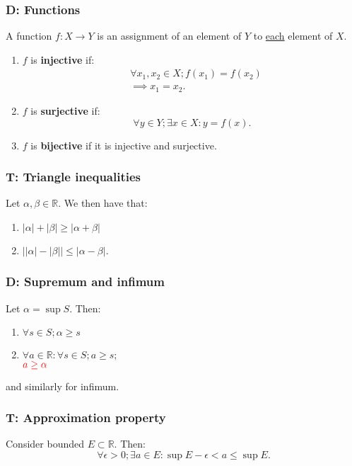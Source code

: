 \documentclass{article}
\begin{document}
\begin{multicols*}{3}
\noindent

\subsubsection*{D: Functions}
A function $f:X\rightarrow Y$ is an assignment
of an element of $Y$ to \underline{each} element of $X$.
\begin{enumerate}
    \item $f$ is \textbf{injective} if:
    \begin{align*}
        &\forall x_1,x_2\in X;
        f(x_1)=f(x_2) \\ &\implies x_1=x_2.
    \end{align*}

    \item $f$ is \textbf{surjective} if:
    $$\forall y\in Y;\exists x\in X: y=f(x).$$

    \item $f$ is \textbf{bijective}
    if it is injective and surjective.
\end{enumerate}

\subsubsection*{T: Triangle inequalities}
Let $\alpha,\beta\in\mathbb{R}$.
We then have that:
\begin{enumerate}
    \item $|\alpha|+|\beta|
    \geq|\alpha+\beta|$

    \item $\bigl||\alpha|-|\beta|\bigr|
    \leq|\alpha-\beta|$.
\end{enumerate}

\subsubsection*{D: Supremum and infimum}
Let $\alpha=\sup S$. Then:
\begin{enumerate}
    \item $\forall s\in S; \alpha\geq s$
    \item $\forall a\in\mathbb{R}:
    \forall s\in S; a\geq s;$ \\
    $\textcolor{red}{a\geq\alpha}$
\end{enumerate}
and similarly for infimum.

\subsubsection*{T: Approximation property}
Consider bounded $E\subset\mathbb{R}$. Then:
$$\forall\epsilon>0;\exists a\in E:
\sup E-\epsilon<a\leq\sup E.$$


\end{multicols*}
\end{document}
